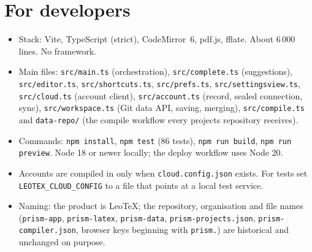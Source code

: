 \documentclass[11pt,a4paper]{article}
\newcommand{\leotex}{Leo\TeX{}}
\newcommand{\fpath}[1]{\texttt{\small #1}}
\begin{document}
\section{For developers}
\begin{itemize}
  \item Stack: Vite, TypeScript (strict), CodeMirror~6, pdf.js, fflate. About 6\,000 lines. No framework.
  \item Main files: \fpath{src/main.ts} (orchestration), \fpath{src/complete.ts} (suggestions), \fpath{src/editor.ts}, \fpath{src/shortcuts.ts}, \fpath{src/prefs.ts}, \fpath{src/settingsview.ts},
        \fpath{src/cloud.ts} (account client), \fpath{src/account.ts} (record, sealed connection, sync), \fpath{src/workspace.ts} (Git data API, saving, merging),
        \fpath{src/compile.ts} and \fpath{data-repo/} (the compile workflow every projects repository receives).
  \item Commands: \verb|npm install|, \verb|npm test| (86 tests), \verb|npm run build|, \verb|npm run preview|. Node 18 or newer locally; the deploy workflow uses Node 20.
  \item Accounts are compiled in only when \fpath{cloud.config.json} exists. For tests set \verb|LEOTEX_CLOUD_CONFIG| to a file that points at a local test service.
  \item Naming: the product is \leotex{}; the repository, organisation and file names (\fpath{prism-app}, \fpath{prism-latex}, \fpath{prism-data}, \fpath{prism-projects.json}, \fpath{prism-compiler.json}, browser
        keys beginning with \texttt{prism.}) are historical and unchanged on purpose.
\end{itemize}
\end{document}
